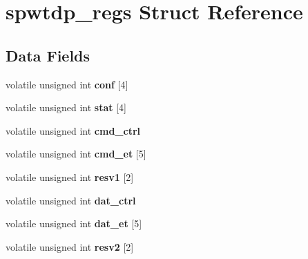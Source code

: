 \hypertarget{structspwtdp__regs}{}\section{spwtdp\+\_\+regs Struct Reference}
\label{structspwtdp__regs}
\subsection*{Data Fields}
\begin{DoxyCompactItemize}
\item 
\mbox{\label{structspwtdp__regs_a86d6fd1565bf693e053f7a8a556da707}} 
volatile unsigned int {\bfseries conf} \mbox{[}4\mbox{]}
\item 
\mbox{\label{structspwtdp__regs_a98de66e4fc2178dc6ccf3a01cb164d1d}} 
volatile unsigned int {\bfseries stat} \mbox{[}4\mbox{]}
\item 
\mbox{\label{structspwtdp__regs_afa4c288404cca0b6382ed87818e9eb2f}} 
volatile unsigned int {\bfseries cmd\+\_\+ctrl}
\item 
\mbox{\label{structspwtdp__regs_a3b351d130a25cba7569165b0ae4b8cf8}} 
volatile unsigned int {\bfseries cmd\+\_\+et} \mbox{[}5\mbox{]}
\item 
\mbox{\label{structspwtdp__regs_a2f2f2086dfc3d177a9de0894842550d4}} 
volatile unsigned int {\bfseries resv1} \mbox{[}2\mbox{]}
\item 
\mbox{\label{structspwtdp__regs_aff18c2c1344ff2fe056063f8a04c5bae}} 
volatile unsigned int {\bfseries dat\+\_\+ctrl}
\item 
\mbox{\label{structspwtdp__regs_af19be5bbfddb86f61ec81c80b088cdc1}} 
volatile unsigned int {\bfseries dat\+\_\+et} \mbox{[}5\mbox{]}
\item 
\mbox{\label{structspwtdp__regs_aff110960ba5130e689d0ce13d9439cf9}} 
volatile unsigned int {\bfseries resv2} \mbox{[}2\mbox{]}
\item 
\mbox{\label{structspwtdp__regs_a7ac1e818da3d9daeac43fba3ba8b1bdb}} 

\end{DoxyCompactItemize}
